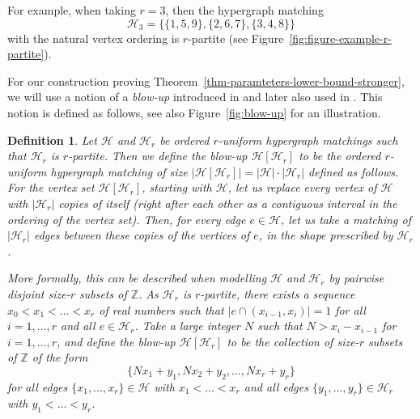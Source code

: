 \documentclass{aic}
\newtheorem{definition}[theorem]{Definition}
\theoremstyle{definition}
\numberwithin{equation}{section}
\numberwithin{figure}{section}
\newcommand{\Z}{\mathbb{Z}}
\newcommand{\HH}{\mathcal{H}}
\begin{document}
For example, when taking $r=3$, then the hypergraph matching
\[
\HH_3 = \{ \{1,5,9\}, \{2,6,7\} ,\{3, 4,8\}\}
\]
with the natural vertex ordering is $r$-partite (see Figure~\ref{fig:figure-example-r-partite}).

For our construction proving Theorem~\ref{thm-paramteters-lower-bound-stronger}, we will use a notion of a {\em blow-up} introduced in \cite{DGR22} and later also used in \cite{AJKS}. This notion is defined as follows, see also Figure~\ref{fig:blow-up} for an illustration.

\begin{definition}\label{def-blow-up}
    Let $\HH$ and $\HH_r$ be ordered $r$-uniform hypergraph matchings such that $\HH_r$ is $r$-partite. Then we define the blow-up $\HH[\HH_r]$ to be the ordered $r$-uniform hypergraph matching of size $|\HH[\HH_r]|=|\HH|\cdot |\HH_r|$ defined as follows. For the vertex set $\HH[\HH_r]$, starting with $\HH$, let us replace every vertex of $\HH$ with $|\HH_r|$ copies of itself (right after each other as a contiguous interval in the ordering of the vertex set). Then, for every edge $e\in \HH$, let us take a matching of $|\HH_r|$ edges between these copies of the vertices of $e$, in the shape prescribed by $\HH_r$.

    More formally, this can be described when modelling $\HH$ and $\HH_r$ by pairwise disjoint size-$r$ subsets of $\Z$. As $\HH_r$ is $r$-partite, there exists a sequence $x_0 < x_1 < \ldots < x_r$ of real numbers such that $|e\cap (x_{i-1},x_i)|=1$ for all $i=1,\dots,r$ and all $e\in \HH_r$. Take a large integer $N$ such that $N>x_i-x_{i-1}$ for $i=1,\dots,r$, and define the blow-up $\HH[\HH_r]$ to be the collection of size-$r$ subsets of $\Z$ of the form
    \[\{ N x_1 + y_1, N x_2 + y_2, \ldots, N x_r + y_r \}\]
    for all edges $\{x_1,\dots,x_r\}\in \HH$ with $x_1<\dots<x_r$ and all edges $\{y_1,\dots,y_r\}\in \HH_r$ with $y_1<\dots<y_r$.
\end{definition}
\end{document}
